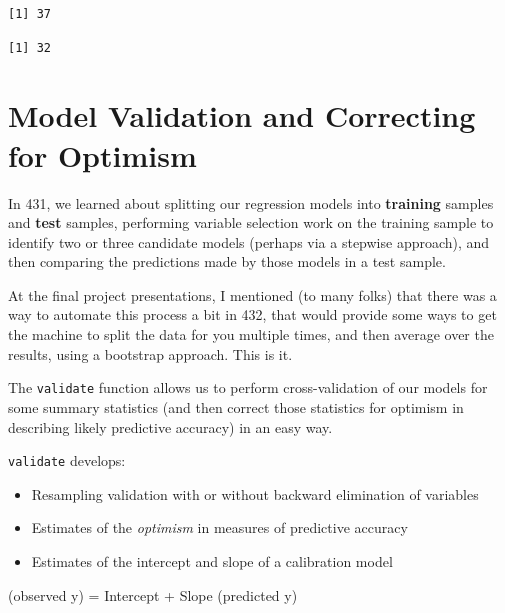 \documentclass[]{book}
\newenvironment{Shaded}{\begin{snugshade}}{\end{snugshade}}
\newcommand{\KeywordTok}[1]{\textcolor[rgb]{0.13,0.29,0.53}{\textbf{#1}}}
\newcommand{\OperatorTok}[1]{\textcolor[rgb]{0.81,0.36,0.00}{\textbf{#1}}}
\newcommand{\NormalTok}[1]{#1}
\providecommand{\tightlist}{%
  \setlength{\itemsep}{0pt}\setlength{\parskip}{0pt}}
\theoremstyle{definition}
\theoremstyle{definition}
\theoremstyle{definition}
\theoremstyle{remark}
\begin{document}
\begin{verbatim}
[1] 37
\end{verbatim}

\begin{Shaded}
\end{Shaded}

\begin{verbatim}
[1] 32
\end{verbatim}

\section{Model Validation and Correcting for
Optimism}\label{model-validation-and-correcting-for-optimism}

In 431, we learned about splitting our regression models into
\textbf{training} samples and \textbf{test} samples, performing variable
selection work on the training sample to identify two or three candidate
models (perhaps via a stepwise approach), and then comparing the
predictions made by those models in a test sample.

At the final project presentations, I mentioned (to many folks) that
there was a way to automate this process a bit in 432, that would
provide some ways to get the machine to split the data for you multiple
times, and then average over the results, using a bootstrap approach.
This is it.

The \texttt{validate} function allows us to perform cross-validation of
our models for some summary statistics (and then correct those
statistics for optimism in describing likely predictive accuracy) in an
easy way.

\texttt{validate} develops:

\begin{itemize}
\tightlist
\item
  Resampling validation with or without backward elimination of
  variables
\item
  Estimates of the \emph{optimism} in measures of predictive accuracy
\item
  Estimates of the intercept and slope of a calibration model
\end{itemize}

\begin{center}
(observed y) = Intercept + Slope (predicted y)
\end{center}
\end{document}

